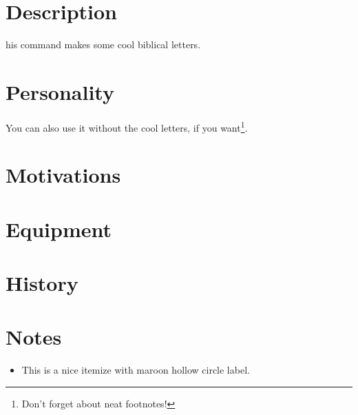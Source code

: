 \begin{multicols}{2}

\section*{Description}

his command makes some cool biblical letters. \lipsum[1][1-5]


\section*{Personality}

You can also use it without the cool letters, if you want\footnote{Don't forget about neat footnotes!}.


\section*{Motivations}

\lipsum[1][1-5]


\section*{Equipment}

\lipsum[1][1-5]


\section*{History}

\lipsum[1][1-5]


\section*{Notes}

\begin{itemize}[label=\color{maroon}$\circ$, leftmargin=1.2em]
    \item This is a nice itemize with maroon hollow circle label.
\end{itemize}

\end{multicols}